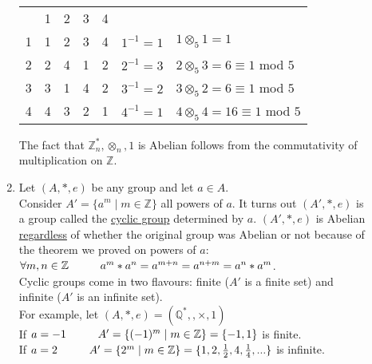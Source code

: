 \documentclass[10pt]{article}
\begin{document}
\begin{description}
\begin{enumerate}
			\begin{center}
				\begin{tabular}[h!]{|c|cccc|rl}
					\cline{1-5}
					& 1 & 2 & 3 & 4\\ \cline{1-5}
					1 & 1 & 2 & 3 & 4 & \hspace{10mm} $1^{-1} = 1$ & $1 \otimes_5 1 = 1$ \\
					2 & 2 & 4 & 1 & 2 & \hspace{10mm} $2^{-1} = 3$ & $2 \otimes_5 3 = 6 \equiv 1$ mod $5$ \\
					3 & 3 & 1 & 4 & 2 & \hspace{10mm} $3^{-1} = 2$ & $3 \otimes_5 2 = 6 \equiv 1$ mod $5$ \\
					4 & 4 & 3 & 2 & 1 & \hspace{10mm} $4^{-1} = 1$ & $4 \otimes_5 4 = 16 \equiv 1$ mod $5$ \\
					\cline{1-5}
				\end{tabular}
			\end{center}
			The fact that $\mathbb{Z}^*_n, \otimes _n, 1$ is Abelian follows from the commutativity of multiplication on $\mathbb{Z}$.
			\item Let $(A, *, e)$ be any group and let $a \in A$. \\
			Consider $A' = \{a^m \mid m \in \mathbb{Z}\}$ all powers of $a$. It turns out $(A', *, e)$ is a group called the \underline{cyclic group} determined by $a$. $(A', *, e)$ is Abelian \underline{regardless} of whether the original group was Abelian or not because of the theorem we proved on powers of $a$: $\forall m, n \in \mathbb{Z} \hspace{10mm} a^m * a^n = a^{m+n} = a^{n+m} = a^n * a^m$. \\
			Cyclic groups come in two flavours: finite ($A'$ is a finite set) and infinite ($A'$ is an infinite set). \\
			For example, let $(A, *, e) = (\mathbb{Q}^*, , \times , 1)$ \\
			If $a=-1 \hspace{10mm} A' = \{(-1)^m \mid m \in \mathbb{Z}\} = \{-1, 1\}$ is finite. \\
			If $a=2 \hspace{10mm} A' = \{2^m \mid m \in \mathbb{Z}\} = \{1, 2, \frac{1}{2}, 4, \frac{1}{4}, ...\}$ is infinite.
		\end{enumerate}
	\end{description}
	
\end{document}

